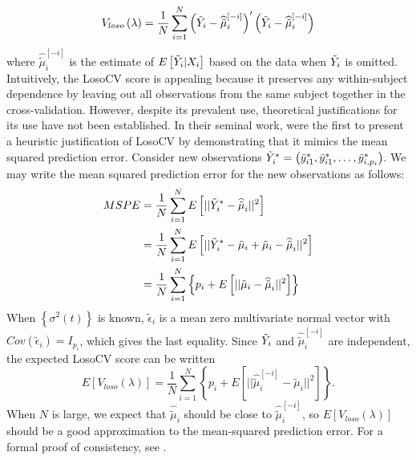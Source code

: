 \begin{equation} \label{eq:LOSOCV}
V_{loso}\left(\lambda\right) = \frac{1}{N}\sum_{i=1}^N \left( \tilde{Y}_i - \widehat{\tilde{\mu}}^{\left[-i\right]}_{i}\right)'\left( \tilde{Y}_i -  \widehat{\tilde{\mu}}^{\left[-i\right]}_{i}\right)
\end{equation}
\noindent
where $\widehat{\tilde{\mu}}^{\left[-i\right]}_{i}$ is the estimate of $E\left[ \tilde{Y}_i \vert X_i \right]$ based on the data when $\tilde{Y}_i$ is omitted. Intuitively, the LosoCV score is appealing because it preserves any within-subject dependence by leaving out all observations from the same subject together in the cross-validation.  However, despite its prevalent use, theoretical justifications for its use have not been established. In their seminal work, \cite{rice1991estimating} were the first to present a heuristic justification of LosoCV by demonstrating that it mimics the mean squared prediction error. Consider new observations $\tilde{Y}^*_i = \left(\tilde{y}_{i1}^*, \tilde{y}_{i1}^*, \dots, \tilde{y}_{i, p_i}^*\right)$. We may write the mean squared prediction error for the new observations as follows:  
\bigskip 
\begin{align}
\begin{split}\label{eq:MSPE}
MSPE &= \frac{1}{N}\sum_{i=1}^N E\left[ \vert \vert \tilde{Y}^*_i - \widehat{\tilde{\mu}}_{i} \vert \vert^2 \right]\\
&=  \frac{1}{N}\sum_{i=1}^N E\left[ \vert \vert \tilde{Y}^*_i -  \tilde{\mu}_{i}+ \tilde{\mu}_{i} - \widehat{\tilde{\mu}}_{i} \vert \vert^2 \right]\\
&=  \frac{1}{N}\sum_{i=1}^N \left\{p_i + E\left[ \vert \vert \tilde{\mu}_{i} - \widehat{\tilde{\mu}}_{i} \vert \vert^2 \right] \right\}
\end{split}
\end{align}
\noindent
When $\left\{ \sigma^2\left(t\right)\right\}$ is known, $\tilde{\epsilon}_i$ is a mean zero multivariate normal vector with $Cov\left(\tilde{\epsilon}_i\right) = I_{p_i}$, which gives the last equality. Since $\tilde{Y}_i$ and $ \widehat{\tilde{\mu}}^{\left[ -i \right]}_{i} $ are independent, the expected LosoCV score can be written
\begin{equation} \label{eq:MSPE_LOSOCV}
E\left[V_{loso}\left(\lambda\right) \right] =  \frac{1}{N}\sum_{i=1}^N\left\{ p_i +  E\left[ \vert \vert \widehat{\tilde{\mu}}^{\left[ -i \right]}_{i} - \tilde{\mu}_{i} \vert \vert^2 \right] \right\}. 
\end{equation}
\noindent
When $N$ is large, we expect that $\widehat{\tilde{\mu}}_{i}$ should be close to $\widehat{\tilde{\mu}}^{\left[ -i \right]}_{i}$, so $E\left[V_{loso}\left(\lambda\right) \right]$ should be a good approximation to the mean-squared prediction error. For a formal proof of consistency, see \cite{xu2012asymptotic}.

